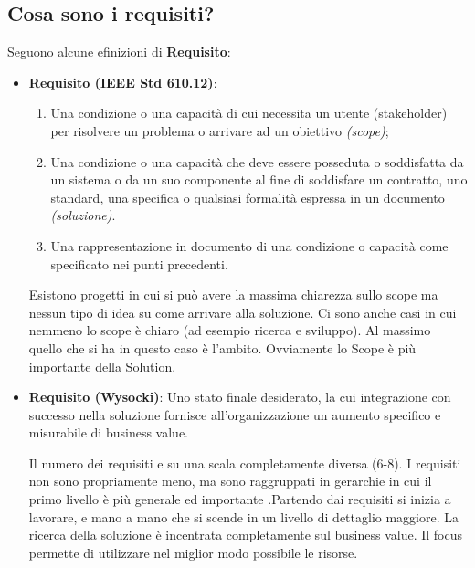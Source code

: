 \subsection{Cosa sono i requisiti?}
Seguono alcune efinizioni di \textbf{Requisito}:
\begin{itemize}
	\item \textbf{Requisito (IEEE Std 610.12)}:
	\begin{enumerate}
		\item Una condizione o una capacità di cui necessita un utente (stakeholder) per risolvere un problema o arrivare ad un obiettivo \textit{(scope)};
		\item Una condizione o una capacità che deve essere posseduta o soddisfatta da un sistema o da un suo componente al fine di soddisfare un contratto, uno standard, una specifica o qualsiasi formalità espressa in un documento \textit{(soluzione)}.
		\item Una rappresentazione in documento di una condizione o capacità come specificato nei punti precedenti.
	\end{enumerate}
	\begin{warn}
		Esistono progetti in cui si può avere la massima chiarezza sullo scope ma nessun tipo di idea su come arrivare alla soluzione. Ci sono anche casi in cui nemmeno lo scope è chiaro (ad esempio ricerca e sviluppo). Al massimo quello che si ha in questo caso è l'ambito. Ovviamente lo Scope è più importante della Solution.
	\end{warn}
	\item \textbf{Requisito (Wysocki)}: Uno stato finale desiderato, la cui integrazione con successo nella soluzione fornisce all'organizzazione un aumento specifico e misurabile di business value.
	\begin{info}
		Il numero dei requisiti e su una scala completamente diversa (6-8). I requisiti non sono propriamente meno, ma sono raggruppati in gerarchie in cui il primo livello è più generale ed importante .Partendo dai requisiti si inizia a lavorare, e mano a mano che si scende in un livello di dettaglio maggiore. La ricerca della soluzione è incentrata completamente sul business value. Il focus permette di utilizzare nel miglior modo possibile le risorse.
	\end{info}
\end{itemize}
